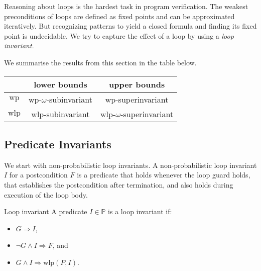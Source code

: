 \documentclass[english]{panikzettel}
\renewcommand{\wp}{\mathrm{wp}}
\newcommand{\wlp}{\mathrm{wlp}}
\begin{document}
Reasoning about loops is the hardest task in program verification.
The weakest preconditions of loops are defined as fixed points and can be approximated iteratively.
But recognizing patterns to yield a closed formula and finding its fixed point is undecidable.
We try to capture the effect of a loop by using a \emph{loop invariant}.

We summarise the results from this section in the table below.
\begin{center}
    \begin{tabular}{c|c|c}
               & \textbf{lower bounds} & \textbf{upper bounds} \\ \hline
        $\wp$  & $\wp$-$\omega$-subinvariant & $\wp$-superinvariant \\
        $\wlp$ & $\wlp$-subinvariant & $\wlp$-$\omega$-superinvariant
    \end{tabular}
\end{center}

\subsection{Predicate Invariants}

\begin{halfboxl}
    We start with non-probabilistic loop invariants.
    A non-probabilistic loop invariant $I$ for a postcondition $F$ is a predicate that holds whenever the loop guard holds, that establishes the postcondition after termination, and also holds during execution of the loop body.
\end{halfboxl}%
\begin{halfboxr}
    \vspace{-\baselineskip}
    \begin{defi}{Loop invariant}
        A predicate $I \in \mathbb{P}$ is a loop invariant if:
        \begin{itemize}
            \item $G \Rightarrow I$,
            \item $\neg G \land I \Rightarrow F$, and
            \item $G \land I \Rightarrow \wlp(P,I)$.
        \end{itemize}
    \end{defi}
\end{halfboxr}
\end{document}
